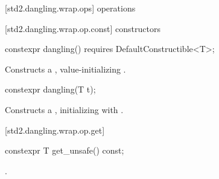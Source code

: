 [std2.dangling.wrap.ops]{ operations}

[std2.dangling.wrap.op.const]{ constructors}

%
\begin{itemdecl}
constexpr dangling() requires DefaultConstructible<T>;
\end{itemdecl}

\begin{itemdescr}
\pnum
\effects Constructs a , value-initializing .
\end{itemdescr}

%
\begin{itemdecl}
constexpr dangling(T t);
\end{itemdecl}

\begin{itemdescr}
\pnum
\effects Constructs a , initializing  with .
\end{itemdescr}

[std2.dangling.wrap.op.get]{}

%
%
\begin{itemdecl}
constexpr T get_unsafe() const;
\end{itemdecl}

\begin{itemdescr}
\pnum
\returns {}.
\end{itemdescr}

